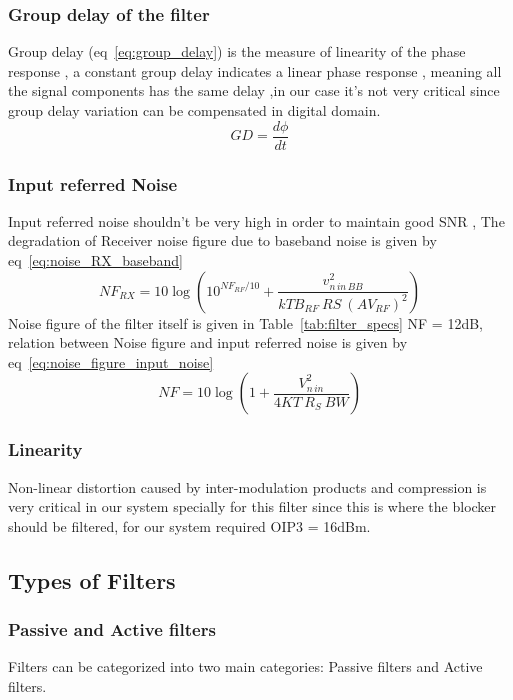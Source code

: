 \subsubsection{Group delay of the filter}%
Group delay (eq~\ref{eq:group_delay})  is the measure of linearity
of the phase response , a constant group delay indicates a linear
phase response , meaning all the signal components has the 
same delay \cite{Saari2012} ,in our case it's not very critical since group delay variation can be compensated in digital domain.
\begin{equation}
    GD = \frac{d\phi}{dt}
    \label{eq:group_delay}
\end{equation}

\subsubsection{Input referred Noise}%
Input referred noise shouldn't be very high in order to maintain
good SNR , The degradation of Receiver noise figure due to
baseband noise is given by eq~\ref{eq:noise_RX_baseband} \cite{Saari2012}
\begin{equation}
    NF_{RX} = 10 \log(10^{NF_{RF}/10} + 
    \frac{v_{n\,in\,BB}^2}{k T B_{RF}\ RS\ (AV_{RF})^2})
    \label{eq:noise_RX_baseband}
\end{equation}
Noise figure of the filter itself is given in Table~\ref{tab:filter_specs} NF = 12dB, relation between Noise figure and input 
referred noise is given by eq~\ref{eq:noise_figure_input_noise}
\begin{equation}
    NF = 10\log(1+ \frac{V_{n\, in}^2}{4KT\ R_S \ BW})
    \label{eq:noise_figure_input_noise}
\end{equation}

\subsubsection{Linearity}%
Non-linear distortion caused by inter-modulation products and 
compression is very critical in our system specially for this 
filter since this is where the blocker should be filtered, 
for our system required OIP3 = 16dBm.

\subsection{Types of Filters}%
\subsubsection{Passive and Active filters}%
Filters can be categorized into two main categories: Passive filters
and Active filters.

